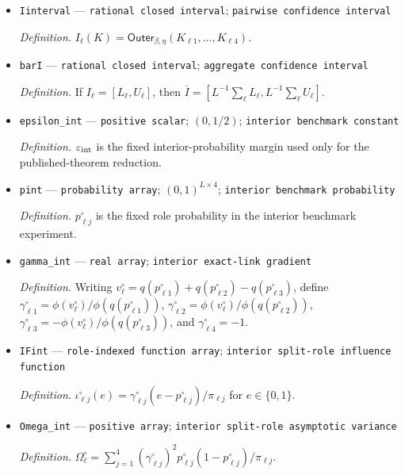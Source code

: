\documentclass{article}
\begin{document}
\begin{itemize}
  \par\smallskip\noindent\emph{Definition.} \(\mathsf{Outer}_{\beta,\eta}\) is the finite rational-grid construction defined below.
  \item \texttt{Iinterval} --- \texttt{rational closed interval}; \texttt{pairwise confidence interval}
  \par\smallskip\noindent\emph{Definition.} \(I_{\ell}(K)=\mathsf{Outer}_{\beta,\eta}(K_{\ell1},\ldots,K_{\ell4})\).
  \item \texttt{barI} --- \texttt{rational closed interval}; \texttt{aggregate confidence interval}
  \par\smallskip\noindent\emph{Definition.} If \(I_{\ell}=[L_{\ell},U_{\ell}]\), then \(\overline I=[L^{-1}\sum_{\ell}L_{\ell},L^{-1}\sum_{\ell}U_{\ell}]\).
  \item \texttt{epsilon\_\allowbreak{}int} --- \texttt{positive scalar}; \((0,1/2)\); \texttt{interior benchmark constant}
  \par\smallskip\noindent\emph{Definition.} \(\varepsilon_{\rm int}\) is the fixed interior-probability margin used only for the published-theorem reduction.
  \item \texttt{pint} --- \texttt{probability array}; \((0,1)^{L\times4}\); \texttt{interior benchmark probability}
  \par\smallskip\noindent\emph{Definition.} \(p^{\circ}_{\ell j}\) is the fixed role probability in the interior benchmark experiment.
  \item \texttt{gamma\_\allowbreak{}int} --- \texttt{real array}; \texttt{interior exact-\allowbreak{}link gradient}
  \par\smallskip\noindent\emph{Definition.} Writing \(v^{\circ}_{\ell}=q(p^{\circ}_{\ell1})+q(p^{\circ}_{\ell2})-q(p^{\circ}_{\ell3})\), define \(\gamma^{\circ}_{\ell1}=\phi(v^{\circ}_{\ell})/\phi(q(p^{\circ}_{\ell1}))\), \(\gamma^{\circ}_{\ell2}=\phi(v^{\circ}_{\ell})/\phi(q(p^{\circ}_{\ell2}))\), \(\gamma^{\circ}_{\ell3}=-\phi(v^{\circ}_{\ell})/\phi(q(p^{\circ}_{\ell3}))\), and \(\gamma^{\circ}_{\ell4}=-1\).
  \item \texttt{IFint} --- \texttt{role-\allowbreak{}indexed function array}; \texttt{interior split-\allowbreak{}role influence function}
  \par\smallskip\noindent\emph{Definition.} \(\iota^{\circ}_{\ell j}(e)=\gamma^{\circ}_{\ell j}(e-p^{\circ}_{\ell j})/\pi_{\ell j}\) for \(e\in\{0,1\}\).
  \item \texttt{Omega\_\allowbreak{}int} --- \texttt{positive array}; \texttt{interior split-\allowbreak{}role asymptotic variance}
  \par\smallskip\noindent\emph{Definition.} \(\Omega^{\circ}_{\ell}=\sum_{j=1}^{4}(\gamma^{\circ}_{\ell j})^2p^{\circ}_{\ell j}(1-p^{\circ}_{\ell j})/\pi_{\ell j}\).
\end{itemize}
\end{document}
